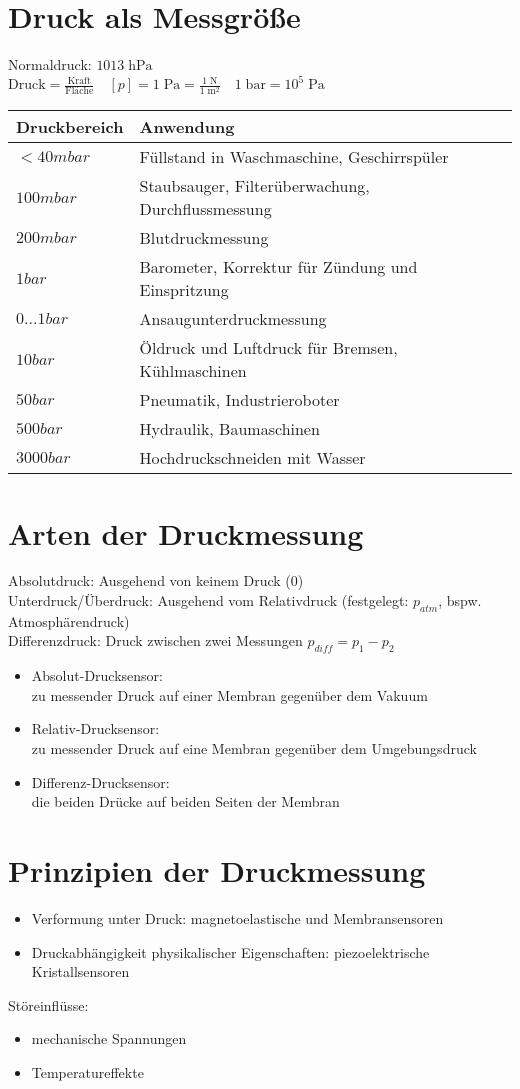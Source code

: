 \documentclass{scrreprt}
\begin{document}
\section{Druck als Messgröße}
Normaldruck: $1013\;\mathrm{hPa}$\\
$\text{Druck}=\frac{\text{Kraft}}{\text{Fläche}} \quad [p]=1\;\mathrm{Pa}=\frac{1 \;\mathrm{N}}{1 \;\mathrm{m^2}} \quad 1 \;\mathrm{bar} = 10^5 \;\mathrm{Pa}$\\
\begin{tabular}{l | l}
Druckbereich & Anwendung\\\hline
$<40 \unit{mbar}$ & Füllstand in Waschmaschine, Geschirrspüler\\
$100\unit{mbar}$ & Staubsauger, Filterüberwachung, Durchflussmessung\\
$200\unit{mbar}$ & Blutdruckmessung\\
$1\unit{bar}$ & Barometer, Korrektur für Zündung und Einspritzung\\
$0\dots 1 \unit{bar}$ & Ansaugunterdruckmessung\\
$10\unit{bar}$ & Öldruck und Luftdruck für Bremsen, Kühlmaschinen\\
$50 \unit{bar}$ & Pneumatik, Industrieroboter\\
$500 \unit{bar}$ & Hydraulik, Baumaschinen\\
$3000 \unit{bar}$ & Hochdruckschneiden mit Wasser
\end{tabular}
\section{Arten der Druckmessung}
Absolutdruck: Ausgehend von keinem Druck ($0$)\\
Unterdruck/Überdruck: Ausgehend vom Relativdruck (festgelegt: $p_{atm}$, bspw. Atmosphärendruck)\\
Differenzdruck: Druck zwischen zwei Messungen $p_{diff}=p_1-p_2$
\begin{itemize}
\item Absolut-Drucksensor:\\
zu messender Druck auf einer Membran gegenüber dem Vakuum
\item Relativ-Drucksensor:\\
zu messender Druck auf eine Membran gegenüber dem Umgebungsdruck
\item Differenz-Drucksensor:\\
die beiden Drücke auf beiden Seiten der Membran
\end{itemize}
\section{Prinzipien der Druckmessung}
\begin{itemize}
\item Verformung unter Druck: magnetoelastische und Membransensoren
\item Druckabhängigkeit physikalischer Eigenschaften: piezoelektrische Kristallsensoren
\end{itemize}
Störeinflüsse:
\begin{itemize}
\item mechanische Spannungen
\item Temperatureffekte
\end{itemize}
\end{document}
